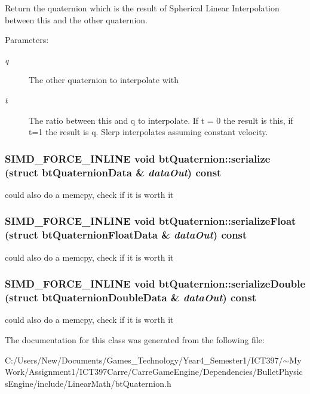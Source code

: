 Return the quaternion which is the result of Spherical Linear Interpolation between this and the other quaternion. 

\begin{Desc}
\item[Parameters:]
\begin{description}
\item[{\em q}]The other quaternion to interpolate with \item[{\em t}]The ratio between this and q to interpolate. If t = 0 the result is this, if t=1 the result is q. Slerp interpolates assuming constant velocity. \end{description}
\end{Desc}
\hypertarget{classbt_quaternion_8bc3a5908e5863652549ac6cf8830ee5}{
\subsubsection[serialize]{\setlength{\rightskip}{0pt plus 5cm}SIMD\_\-FORCE\_\-INLINE void btQuaternion::serialize (struct btQuaternionData \& {\em dataOut}) const}}
\label{classbt_quaternion_8bc3a5908e5863652549ac6cf8830ee5}




could also do a memcpy, check if it is worth it \hypertarget{classbt_quaternion_239a6d8a3dc3904adc6ec07151895a85}{
\subsubsection[serializeFloat]{\setlength{\rightskip}{0pt plus 5cm}SIMD\_\-FORCE\_\-INLINE void btQuaternion::serializeFloat (struct btQuaternionFloatData \& {\em dataOut}) const}}
\label{classbt_quaternion_239a6d8a3dc3904adc6ec07151895a85}




could also do a memcpy, check if it is worth it \hypertarget{classbt_quaternion_23f1203633c7afb3750a9e95fae30f40}{
\subsubsection[serializeDouble]{\setlength{\rightskip}{0pt plus 5cm}SIMD\_\-FORCE\_\-INLINE void btQuaternion::serializeDouble (struct btQuaternionDoubleData \& {\em dataOut}) const}}
\label{classbt_quaternion_23f1203633c7afb3750a9e95fae30f40}




could also do a memcpy, check if it is worth it 

The documentation for this class was generated from the following file:\begin{CompactItemize}
\item 
C:/Users/New/Documents/Games\_\-Technology/Year4\_\-Semester1/ICT397/$\sim$My Work/Assignment1/ICT397Carre/CarreGameEngine/Dependencies/BulletPhysicsEngine/include/LinearMath/btQuaternion.h\end{CompactItemize}
